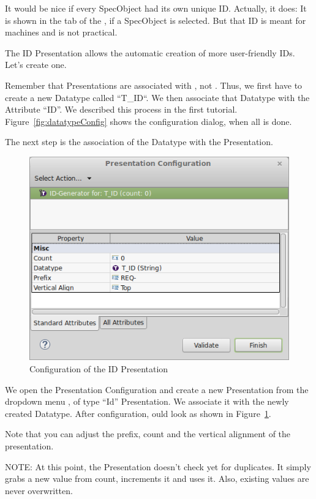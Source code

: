 It would be nice if every SpecObject had its own unique ID.  Actually, it does: It is shown in the  tab of the , if a SpecObject is selected.  But that ID is meant for machines and is not practical.

The ID Presentation allows the automatic creation of more user-friendly IDs.  Let's create one.

Remember that Presentations are associated with , not .  Thus, we first have to create a new Datatype called ``T\_ID``.  We then associate that Datatype with the Attribute ``ID''.  We described this process in the first tutorial.  Figure~\ref{fig:datatypeConfig} shows the configuration dialog, when all is done.

The next step is the association of the Datatype with the Presentation.

\begin{figure}
\centering      
\includegraphics[width=0.8\linewidth]{../rmf-images/presentation_id.png}      
\caption{Configuration of the ID Presentation}
\label{fig:idConfig}
\end{figure}

We open the Presentation Configuration and create a new Presentation from the dropdown menu , of type ``Id'' Presentation.  We associate it with the newly created Datatype.  After configuration, ould look as shown in Figure~\ref{fig:idConfig}.

Note that you can adjust the prefix, count and the vertical alignment of the presentation.

NOTE: At this point, the Presentation doesn't check yet for duplicates.  It simply grabs a new value from count, increments it and uses it.  Also, existing values are never overwritten.

